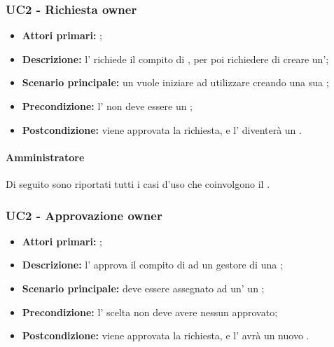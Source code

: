\documentclass[casi-duso]{subfiles}
\begin{document}
\subsubsection{UC2 - Richiesta owner}
\label{subsub:UC2}

\begin{itemize}
  \item \textbf{Attori primari:} ;
  \item \textbf{Descrizione:} l' richiede il compito di , per poi richiedere di creare un';
  \item \textbf{Scenario principale:} un  vuole iniziare ad utilizzare  creando una sua ;
  \item \textbf{Precondizione:} l' non deve essere un ;
  \item \textbf{Postcondizione:} viene approvata la richiesta, e l' diventerà un .

\end{itemize}



\paragraph{Amministratore}
\label{par:amministratore}
Di seguito sono riportati tutti i casi d'uso che coinvolgono il  .


\subsubsection{UC2 - Approvazione owner}
\label{subsub:UC2}

\begin{itemize}
  \item \textbf{Attori primari:} ;
  \item \textbf{Descrizione:} l' approva il compito di  ad un gestore di una ;
  \item \textbf{Scenario principale:} deve essere assegnato ad un' un ;
  \item \textbf{Precondizione:} l' scelta non deve avere nessun  approvato;
  \item \textbf{Postcondizione:} viene approvata la richiesta, e l' avrà un nuovo .

\end{itemize}
\end{document}
